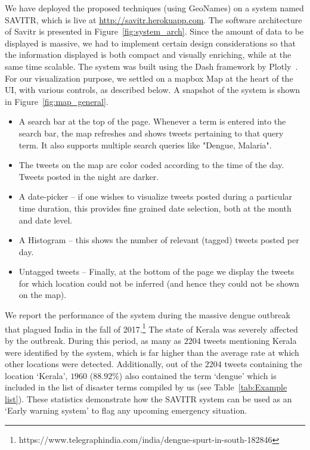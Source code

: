 \noindent We have deployed the proposed techniques (using GeoNames) on a system named SAVITR, which is live at \url{http://savitr.herokuapp.com}.
The software architecture of Savitr is presented in Figure~\ref{fig:system_arch}. 
Since the amount of data to be displayed is massive, we had to implement certain design considerations so that the information displayed is both compact and visually enriching, while at the same time scalable. 
The system was built using the Dash framework by Plotly~\cite{Plotly}. For our visualization purpose, we settled on a mapbox Map at the heart of the UI, with various controls, as described below. A snapshot
of the system is shown in Figure~\ref{fig:map_general}.
\begin{itemize}

\item A search bar at the top of the page. Whenever a term is entered into the search bar, the map refreshes and shows tweets pertaining to that query term. It also supports multiple search queries like "Dengue, Malaria".

\item The tweets on the map are color coded according to the time of the day. Tweets posted in the night are darker.

\item A date-picker -- if one wishes to visualize tweets posted during a particular time duration, this provides fine grained date selection, both at the month and date level.

\item A Histogram -- this shows the number of relevant (tagged) tweets posted per day.

\item Untagged tweets -- Finally, at the bottom of the page we display the tweets for which location could not be inferred (and hence they could not be shown on the map).
\end{itemize}

We report the performance of the system during the massive dengue outbreak that plagued India in the fall of 2017.\footnote{https://www.telegraphindia.com/india/dengue-spurt-in-south-182846} 
The state of Kerala was severely affected by the outbreak. 
During this period, as many as $2204$ tweets mentioning Kerala were identified by the system, which is far higher than the average rate at which other locations were detected. 
Additionally, out of the $2204$ tweets containing the location `Kerala',
$1960$ ($88.92\%$) also contained the term `dengue' which is included in the list of disaster terms compiled by us (see Table~\ref{tab:Example list}).
These statistics demonstrate how the SAVITR system can be used as an `Early warning system' to flag any upcoming emergency situation.


